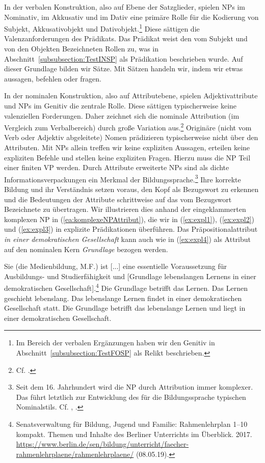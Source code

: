 In der verbalen Konstruktion, also auf Ebene der Satzglieder, spielen NPs im Nominativ, im Akkusativ und im Dativ eine primäre Rolle für die Kodierung von Subjekt, Akkusativobjekt und Dativobjekt.\footnote{Im Bereich der verbalen Ergänzungen haben wir den Genitiv in Abschnitt~\ref{subsubsection:TestFOSP} als Relikt beschrieben.} Diese sättigen die Valenzanforderungen des Prädikats. Das Prädikat weist den vom Subjekt und von den Objekten Bezeichneten Rollen zu, was in Abschnitt~\ref{subsubsection:TestINSP} als Prädikation beschrieben wurde. Auf dieser Grundlage bilden wir Sätze. Mit Sätzen handeln wir, indem wir \zB etwas aussagen, befehlen oder fragen. 

In der nominalen Konstruktion, also auf Attributebene, spielen Adjektivattribute und NPs im Genitiv die zentrale Rolle. Diese sättigen typischerweise keine valenziellen Forderungen. Daher zeichnet sich die nominale Attribution (im Vergleich zum Verbalbereich) durch große Variation aus.\footnote{Cf. \citet[318]{FuhrhopThierrof2005}.} Originäre (nicht vom Verb oder Adjektiv abgeleitete) Nomen prädizieren typischerweise nicht über den Attributen. Mit NPs allein treffen wir keine expliziten Aussagen, erteilen keine expliziten Befehle und stellen keine expliziten Fragen. Hierzu muss die NP Teil einer finiten VP werden. Durch Attribute erweiterte NPs sind als dichte Informationsverpackungen ein Merkmal der Bildungssprache.\footnote{Seit dem 16. Jahrhundert wird die NP durch Attribution immer komplexer. Das führt letztlich zur Entwicklung des für die Bildungssprache typischen Nominalstils. Cf. \citet[36--38]{Admoni1973}, \citet[6]{CziczaHenningetal2012}.} Ihre korrekte Bildung und ihr Verständnis setzen voraus, den Kopf als Bezugswort zu erkennen und die Bedeutungen der Attribute schrittweise auf das vom Bezugswort Bezeichnete zu übertragen. Wir illustrieren dies anhand der eingeklammerten komplexen NP in (\ref{ea:komplexeNPAttribut}), die wir in (\ref{ex:expl1}), (\ref{ex:expl2}) und (\ref{ex:expl3}) in explizite Prädikationen überführen. Das Präpositionalattribut \textit{in einer demokratischen Gesellschaft} kann auch wie in (\ref{ex:expl4}) als Attribut auf den nominalen Kern \textit{Grundlage} bezogen werden.  

\ea \label{ea:Attributbeispiel}
\ea \label{ea:komplexeNPAttribut} Sie (die Medienbildung, M.F.) ist [...] eine essentielle Voraussetzung für Ausbildungs- und Studierfähigkeit und [Grundlage lebenslangen Lernens in einer demokratischen Gesellschaft].\footnote{Senatsverwaltung für Bildung, Jugend und Familie: Rahmenlehrplan 1--10 kompakt. Themen und Inhalte des Berliner Unterrichts im Überblick. 2017. \url{https://www.berlin.de/sen/bildung/unterricht/faecher-rahmenlehrplaene/rahmenlehrplaene/} (08.05.19).}
\ex \label{ex:expl1} Die Grundlage betrifft das Lernen.
\ex \label{ex:expl2} Das Lernen geschieht lebenslang.
\ex \label{ex:expl3} Das lebenslange Lernen findet in einer demokratischen Gesellschaft statt.
\ex \label{ex:expl4} Die Grundlage betrifft das lebenslange Lernen und liegt in einer demokratischen Gesellschaft.
\z 
\z 

